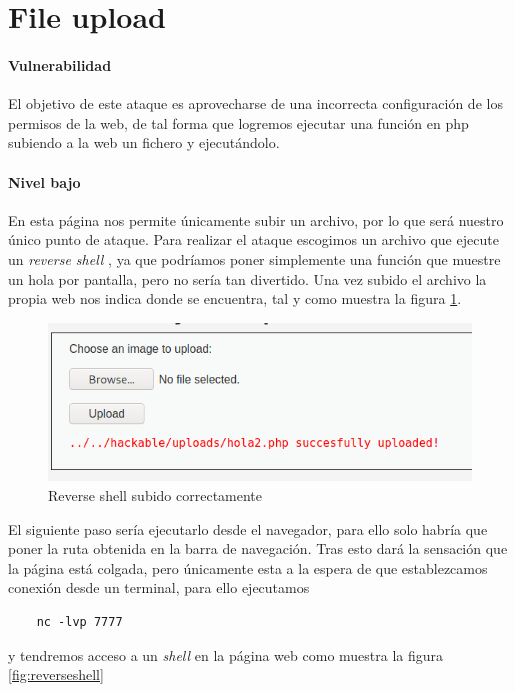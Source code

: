 \section{File upload}\label{sec:upload}
\paragraph{Vulnerabilidad} El objetivo de este ataque es aprovecharse de una incorrecta
configuración de los permisos de la web, de tal forma que logremos ejecutar una función 
en php subiendo a la web un fichero y ejecutándolo.
\paragraph{Nivel bajo} En esta página nos permite únicamente subir un archivo, por lo que será nuestro único
punto de ataque. Para realizar el ataque escogimos un archivo que ejecute un {\it reverse shell} \cite{reverseshell}, ya que podríamos
poner simplemente una función que muestre un hola por pantalla, pero no sería tan divertido. 
Una vez subido el archivo la propia web nos indica donde se encuentra, tal y como muestra la figura \ref{fig:upload}.
\begin{figure}[ht!]
    \centering
    \includegraphics[width=14cm]{img/upload/succes.png}
    \caption{Reverse shell subido correctamente}
    \label{fig:upload}
\end{figure}
El siguiente paso sería ejecutarlo desde el navegador, para ello solo habría que poner 
la ruta obtenida en la barra de navegación. Tras esto dará la sensación que la página está colgada, pero únicamente esta a la espera 
de que establezcamos conexión desde un terminal, para ello ejecutamos
\begin{lstlisting}
    nc -lvp 7777
\end{lstlisting} 
y tendremos acceso a un {\it shell} en la página web como muestra la figura \ref{fig:reverseshell}
